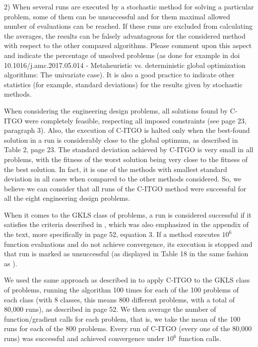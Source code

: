 \begin{revAns}{2) When several runs are executed by a stochastic method for solving a particular problem, some of them can be unsuccessful and for them maximal allowed number of evaluations can be reached. If these runs are excluded from calculating the averages, the results can be falsely advantageous for the considered method with respect to the other compared algorithms. Please comment upon this aspect and indicate the percentage of unsolved problems (as done for example in doi 10.1016/j.amc.2017.05.014 - Metaheuristic vs. deterministic global optimization algorithms: The univariate case). It is also a good practice to indicate other statistics (for example, standard deviations) for the results given by stochastic methods.}

When considering the engineering design problems, all solutions found by C-ITGO were completely feasible, respecting all imposed constraints (see page 23, paragraph 3). Also, the execution of C-ITGO is halted only when the best-found solution in a run is considerably close to the global optimum, as described in Table 2, page 23. The standard deviation achieved by C-ITGO is very small in all problems, with the fitness of the worst solution being very close to the fitness of the best solution. In fact, it is one of the methods with smallest standard deviation in all cases when compared to the other methods considered. So, we believe we can consider that all runs of the C-ITGO method were successful for all the eight engineering design problems.

When it comes to the GKLS class of problems, a run is considered successful if it satisfies the criteria described in \cite{ADC2}, which was also emphasized in the appendix of the text, more specifically in page 52, equation 3. If a method executes $10^6$ function evaluations and do not achieve convergence, its execution is stopped and that run is marked as unsuccessful (as displayed in Table 18 in the same fashion as \cite{NAT}).

We used the same approach as described in \cite{NAT} to apply C-ITGO to the GKLS class of problems, running the algorithm 100 times for each of the 100 problems of each class (with 8 classes, this means 800 different problems, with a total of 80,000 runs), as described in page 52. We then average the number of function/gradient calls for each problem, that is, we take the mean of the 100 runs for each of the 800 problems. Every run of C-ITGO (every one of the 80,000 runs) was successful and achieved convergence under $10^6$ function calls.


\end{revAns}
